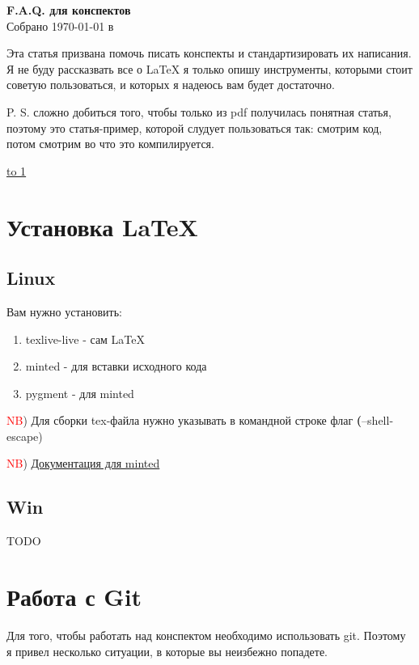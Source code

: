 \documentclass[12pt]{article}
\begin{document}
    \begin{center}

    {\Large \bf F.A.Q. для конспектов} \\
    \vspace{0.5em}
    {\large Собрано {\today} в {\currenttime}}

    Эта статья призвана помочь писать конспекты и стандартизировать их написания. Я не буду рассказвать все о LaTeX я только опишу инструменты, которыми стоит советую пользоваться, и которых я надеюсь вам будет достаточно.


    P. S. сложно добиться того, чтобы только из pdf получилась понятная статья, поэтому это статья-пример, которой слудует пользоваться так: смотрим код, потом смотрим во что это компилируется.

    \end{center}
\underline{\hbox to 1\textwidth{{ } \hfil{ } \hfil{ } }}

\tableofcontents

\newpage

\section{Установка LaTeX}

\subsection{Linux}

Вам нужно установить:
\begin{enumerate}
    \item texlive-live - сам LaTeX
    \item minted - для вставки исходного кода
    \item pygment - для minted
\end{enumerate}


\textcolor{red}{NB}) Для сборки tex-файла нужно указывать в командной строке флаг \textbf(--shell-escape)


\textcolor{red}{NB}) \href{http://tug.ctan.org/macros/latex/contrib/minted/minted.pdf}{Документация для minted}

\subsection{Win}
    TODO
\section{Работа с Git}
Для того, чтобы работать над конспектом необходимо использовать git. Поэтому я привел несколько ситуации, в которые вы неизбежно попадете.
\end{document}
